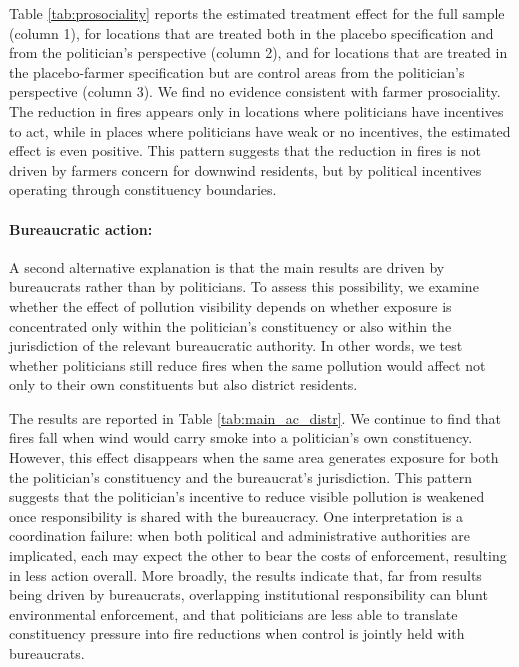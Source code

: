 \documentclass[12pt]{article}
\begin{document}
 Table \ref{tab:prosociality} reports the estimated treatment effect for the full sample (column 1), for locations that are treated both in the placebo specification and from the politician’s perspective (column 2), and for locations that are treated in the placebo-farmer specification but are control areas from the politician’s perspective (column 3). We find no evidence consistent with farmer prosociality. The reduction in fires appears only in locations where politicians have incentives to act, while in places where politicians have weak or no incentives, the estimated effect is even positive. This pattern suggests that the reduction in fires is not driven by farmers concern for downwind residents, but by political incentives operating through constituency boundaries.

\paragraph{Bureaucratic action:}
A second alternative explanation is that the main results are driven by bureaucrats rather than by politicians. To assess this possibility, we examine whether the effect of pollution visibility depends on whether exposure is concentrated only within the politician’s constituency or also within the jurisdiction of the relevant bureaucratic authority. In other words, we test whether politicians still reduce fires when the same pollution would affect not only to their own constituents but also district residents.

The results are reported in Table \ref{tab:main_ac_distr}. We continue to find that fires fall when wind would carry smoke into a politician’s own constituency. However, this effect disappears when the same area generates exposure for both the politician’s constituency and the bureaucrat’s jurisdiction. This pattern suggests that the politician’s incentive to reduce visible pollution is weakened once responsibility is shared with the bureaucracy. One interpretation is a coordination failure: when both political and administrative authorities are implicated, each may expect the other to bear the costs of enforcement, resulting in less action overall. More broadly, the results indicate that, far from results being driven by bureaucrats, overlapping institutional responsibility can blunt environmental enforcement, and that politicians are less able to translate constituency pressure into fire reductions when control is jointly held with bureaucrats.
\end{document}
